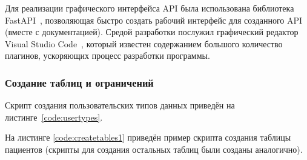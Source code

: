 Для реализации графического интерфейса API была использована библиотека FastAPI~\cite{fastapi}, позволяющая быстро создать рабочий интерфейс для созданного API (вместе с документацией).
Средой разработки  послужил  графический  редактор  Visual  Studio  Code~\cite{vscode},  который известен  содержанием  большого  количество  плагинов,  ускоряющих  процесс разработки  программы.


\subsubsection{Создание таблиц и ограничений}

Скрипт создания пользовательских типов данных приведён на листинге~\ref{code:usertypes}. 


На листинге \ref{code:createtables1} приведён пример скрипта создания таблицы пациентов (скрипты для создания остальных таблиц были созданы аналогично).
\clearpage


